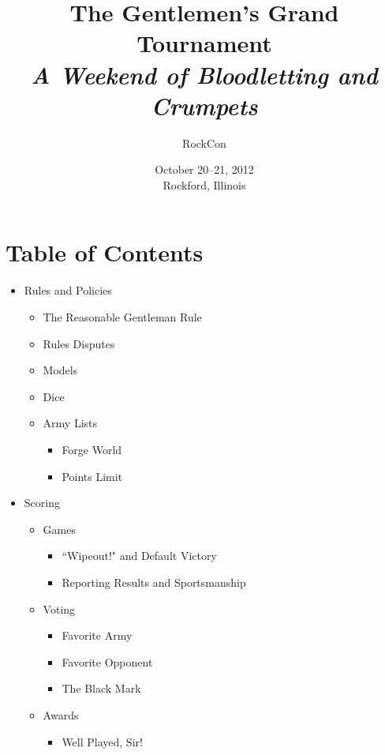 \documentclass[10pt,titlepage]{article}
\begin{document}
\begin{titlepage}
\title{The Gentlemen's Grand Tournament\\{\large\textit{A Weekend of Bloodletting and Crumpets}}}
\author{RockCon}
\date{October 20--21, 2012\\Rockford, Illinois}
\maketitle
\end{titlepage}

\section*{Table of Contents}

\begin{itemize}
\item Rules and Policies
  \begin{itemize}
  \item The Reasonable Gentleman Rule
  \item Rules Disputes
  \item Models
  \item Dice
  \item Army Lists
    \begin{itemize}
    \item Forge World
    \item Points Limit
    \end{itemize}
  \end{itemize}
\item Scoring
  \begin{itemize}
  \item Games
    \begin{itemize}
    \item ``Wipeout!" and Default Victory
    \item Reporting Results and Sportsmanship
    \end{itemize}
  \item Voting
    \begin{itemize}
    \item Favorite Army
    \item Favorite Opponent
    \item The Black Mark
    \end{itemize}
  \item Awards
    \begin{itemize}
    \item Well Played, Sir!

\end{itemize}
\end{itemize}
\end{itemize}
\end{document}
